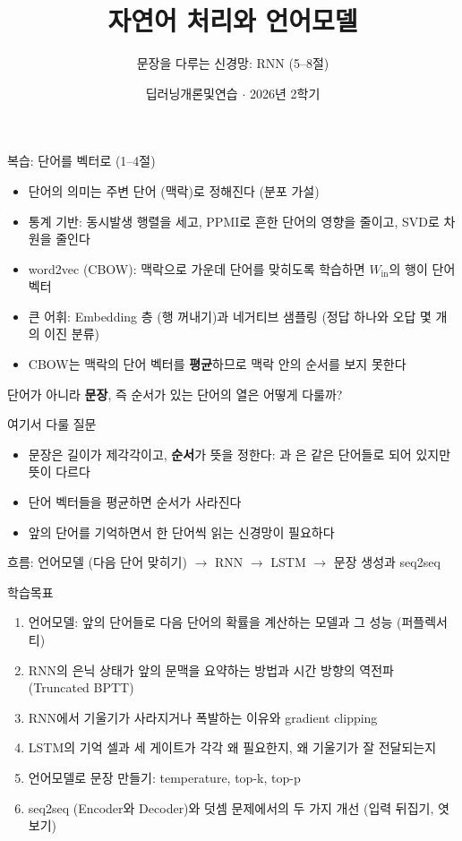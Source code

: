 \documentclass[aspectratio=169,11pt]{beamer}
\title[자연어 처리와 언어모델]{자연어 처리와 언어모델}
\subtitle{문장을 다루는 신경망: RNN (5--8절)}
\date{딥러닝개론및연습 $\cdot$ 2026년 2학기}
\begin{document}
\begin{frame}[plain]\titlepage\end{frame}

\begin{frame}{복습: 단어를 벡터로 (1--4절)}
\begin{itemize}
\item 단어의 의미는 주변 단어 (맥락)로 정해진다 (분포 가설)
\item 통계 기반: 동시발생 행렬을 세고, PPMI로 흔한 단어의 영향을 줄이고, SVD로 차원을 줄인다
\item word2vec (CBOW): 맥락으로 가운데 단어를 맞히도록 학습하면 $W_{\text{in}}$의 행이 단어 벡터
\item 큰 어휘: Embedding 층 (행 꺼내기)과 네거티브 샘플링 (정답 하나와 오답 몇 개의 이진 분류)
\item CBOW는 맥락의 단어 벡터를 \textbf{평균}하므로 맥락 안의 순서를 보지 못한다
\end{itemize}
\vskip2mm
\begin{keybox}[남은 질문]
단어가 아니라 \textbf{문장}, 즉 순서가 있는 단어의 열은 어떻게 다룰까?
\end{keybox}
\end{frame}

\begin{frame}{여기서 다룰 질문}
\begin{keybox}
\begin{itemize}
\item 문장은 길이가 제각각이고, \textbf{순서}가 뜻을 정한다:
과 은 같은 단어들로 되어 있지만 뜻이 다르다
\item 단어 벡터들을 평균하면 순서가 사라진다
\item 앞의 단어를 기억하면서 한 단어씩 읽는 신경망이 필요하다
\end{itemize}
\end{keybox}
\vskip3mm
흐름:
\vskip1mm
\centering
언어모델 (다음 단어 맞히기) $\to$ RNN $\to$ LSTM $\to$ 문장 생성과 seq2seq
\end{frame}

\begin{frame}{학습목표}
\begin{enumerate}
\item 언어모델: 앞의 단어들로 다음 단어의 확률을 계산하는 모델과 그 성능 (퍼플렉서티)
\item RNN의 은닉 상태가 앞의 문맥을 요약하는 방법과 시간 방향의 역전파 (Truncated BPTT)
\item RNN에서 기울기가 사라지거나 폭발하는 이유와 gradient clipping
\item LSTM의 기억 셀과 세 게이트가 각각 왜 필요한지, 왜 기울기가 잘 전달되는지
\item 언어모델로 문장 만들기: temperature, top-k, top-p
\item seq2seq (Encoder와 Decoder)와 덧셈 문제에서의 두 가지 개선 (입력 뒤집기, 엿보기)
\end{enumerate}
\end{frame}
\end{document}
